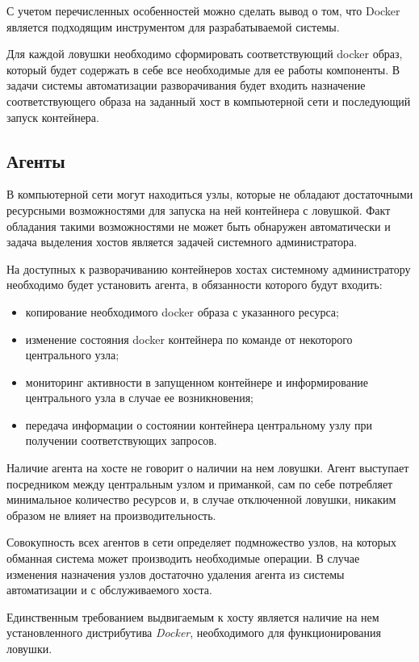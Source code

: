С учетом перечисленных особенностей можно сделать вывод о том, что Docker является подходящим инструментом для разрабатываемой системы.

Для каждой ловушки необходимо сформировать соответствующий docker образ, который будет содержать в себе все необходимые для ее работы компоненты. В задачи системы автоматизации разворачивания будет входить назначение соответствующего образа на заданный хост в компьютерной сети и последующий запуск контейнера.

\subsection{Агенты}

В компьютерной сети могут находиться узлы, которые не обладают достаточными ресурсными возможностями для запуска на ней контейнера с ловушкой. Факт обладания такими возможностями не может быть обнаружен автоматически и задача выделения хостов является задачей системного администратора.

На доступных к разворачиванию контейнеров хостах системному администратору необходимо будет установить агента, в обязанности которого будут входить:

\begin{itemize}
\item копирование необходимого docker образа с указанного ресурса;
\item изменение состояния docker контейнера по команде от некоторого центрального узла;
\item мониторинг активности в запущенном контейнере и информирование центрального узла в случае ее возникновения;
\item передача информации о состоянии контейнера центральному узлу при получении соответствующих запросов.
\end{itemize}

Наличие агента на хосте не говорит о наличии на нем ловушки. Агент выступает посредником между центральным узлом и приманкой, сам по себе потребляет минимальное количество ресурсов и, в случае отключенной ловушки, никаким образом не влияет на производительность.

Совокупность всех агентов в сети определяет подмножество узлов, на которых обманная система может производить необходимые операции. В случае изменения назначения узлов достаточно удаления агента из системы автоматизации и с обслуживаемого хоста.

Единственным требованием выдвигаемым к хосту является наличие на нем установленного дистрибутива \textit{Docker}, необходимого для функционирования ловушки.

